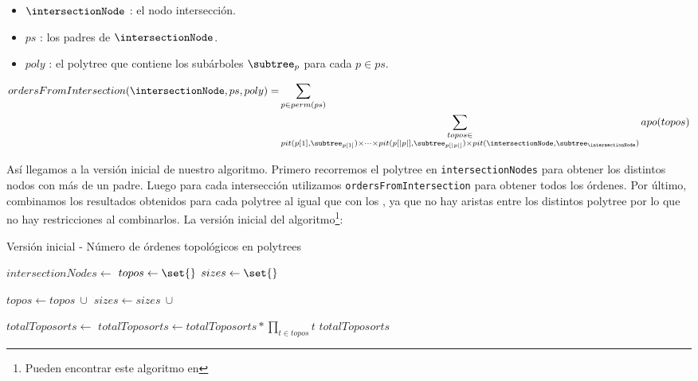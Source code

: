 \begin{itemize}
    \item $\intersectionNode$ : el nodo intersección.
    \item $ps$ : los padres de $\intersectionNode$. 
    \item $poly$ : el polytree que contiene los subárboles $\subtree_p$ para cada $p \in ps$. 
\end{itemize}

\begin{align}\label{formula:combineMultipleParents} 
    ordersFromIntersection(\intersectionNode, ps, poly) =&
    \sum_{p \in perm(ps)} \\& \nonumber
    \sum_{\substack{
    topos \in \\
    pit(p[1], \subtree_{p[1]}) \times \cdots \times pit(p[|p|], \subtree_{p[|p|]}) \times pit(\intersectionNode, \subtree_{\intersectionNode})
}}  apo(topos)
\end{align}

Así llegamos a la versión inicial de nuestro algoritmo. Primero recorremos el polytree en \texttt{intersectionNodes} para obtener los distintos nodos con más de un padre. Luego para cada intersección utilizamos \texttt{ordersFromIntersection} para obtener todos los órdenes. Por último, combinamos los resultados obtenidos para cada polytree al igual que con los \dtrees{}, ya que no hay aristas entre los distintos polytree por lo que no hay restricciones al combinarlos. La versión inicial del algoritmo\footnote{Pueden encontrar este algoritmo en }: 

\begin{algorithm}
\caption{Versión inicial - Número de órdenes topológicos en polytrees} \label{alg:numberToposortsPolytreeFailed}
\begin{algorithmic}[1]
    \State $intersectionNodes \gets$ 
    \State $topos \gets \set{}$
    \State $sizes \gets \set{}$

        \State $topos \gets topos \ \cup $ 
        \State $sizes \gets sizes \ \cup$ 
    \EndFor

    \State $totalToposorts \gets$ 
    \State $totalToposorts \gets totalToposorts * \prod_{t \in topos} t$
    \State \Return $totalToposorts$
\EndFunction
\end{algorithmic}
\end{algorithm}


